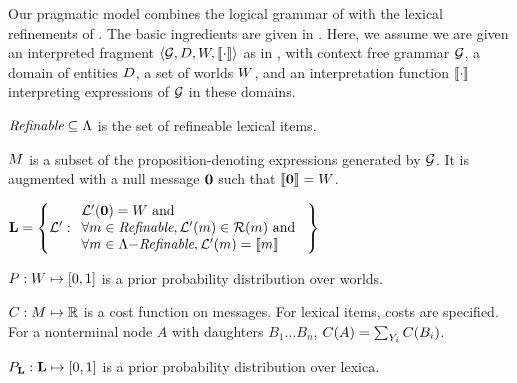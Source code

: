 \documentclass[leqno]{article}
\begin{document}
Our pragmatic model combines the logical grammar of
 with the lexical refinements of
. The basic ingredients are given in
. Here, we assume we are given an interpreted fragment
$\langle \mathcal{G}, D, W, \llbracket\cdot\rrbracket \rangle$ as in
, with context free grammar $\mathcal{G}$, a domain
of entities $D$, a set of worlds $W$, and an
interpretation function $\llbracket\cdot\rrbracket$ interpreting expressions of
$\mathcal{G}$ in these domains.
%
\begin{examples}
\item\label{modobjects}
  \begin{examples}
  \item\label{refineable} $\textit{Refinable} \subseteq \Lambda$ is the set of
    refineable lexical items.

  \item\label{messages} $M$ is a subset of the
    proposition-denoting expressions generated by $\mathcal{G}$. It is
    augmented with a null message $\mathbf{0}$ such that $\llbracket\mathbf{0}\rrbracket
    = W$.

  \item\label{lexset}%
    $\mathbf{L} = \left\{ \mathcal{L}' :       
      \begin{array}[c]{l}
        \mathcal{L}'(\mathbf{0}) = W \text{ and } \\ 
        \forall m \in \textit{Refinable}, \mathcal{L}'(m) \in \mathcal{R}(m) \text{ and } \\
        \forall m \in \Lambda{-}\textit{Refinable}, \mathcal{L}'(m) = \llbracket m\rrbracket
      \end{array} \right\}$
  
  \item $P : W \mapsto [0,1]$ is a prior probability
    distribution over worlds.

  \item $C : M \mapsto \mathbb{R}$ is a cost function on
    messages.  For lexical items, costs are specified. For a
    nonterminal node $A$ with daughters $B_{1} \ldots B_{n}$,
    $C(A) = \sum_{Y_{i}}C(B_{i})$.

  \item $P_{\mathbf{L}} : \mathbf{L} \mapsto [0,1]$ is a prior probability
    distribution over lexica.
  \end{examples}
\end{examples}
\end{document}

